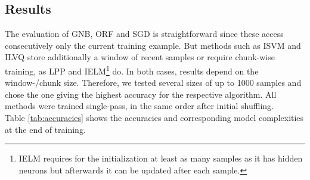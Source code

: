 \documentclass{esann}
\begin{document}
\subsection{Results}
The evaluation of GNB, ORF and SGD is straightforward since these access consecutively only the current training example. 
But methods such as ISVM and ILVQ store additionally a window of recent samples or require chunk-wise training, as LPP and IELM\footnote{IELM requires for the initialization at least as many samples as it has hidden neurons but afterwards it can be updated after each sample.} do.
In both cases, results depend on the window-/chunk size. Therefore, we tested several sizes of up to 1000 samples and chose the one giving the highest accuracy for the respective algorithm.
All methods were trained single-pass, in the same order after initial shuffling. \\
Table \ref{tab:accuracies} shows the accuracies and corresponding model complexities at the end of training.
\end{document}
